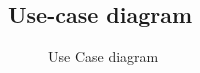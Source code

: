 \subsection {Use-case diagram}
\begin{figure}[htb]
\centering
\setlength\fboxsep{0pt}
\setlength\fboxrule{0.5pt}
\caption{Use Case diagram}
\label{fig:usecase}
\end{figure}


\newpage
